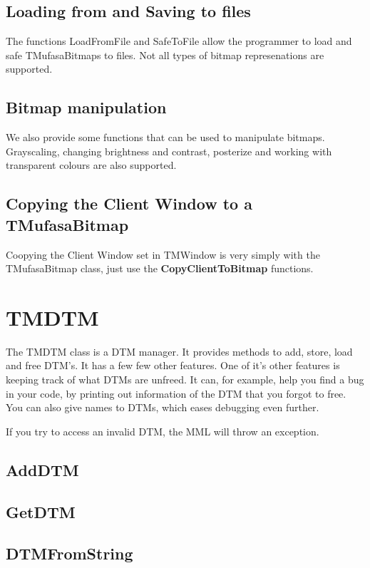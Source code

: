 \documentclass[a4paper]{report}
\begin{document}
\subsection{Loading from and Saving to files}

The functions LoadFromFile and SafeToFile allow the programmer to load and safe
TMufasaBitmaps to files. Not all types of bitmap represenations are supported.


\subsection{Bitmap manipulation}

We also provide some functions that can be used to manipulate bitmaps.
Grayscaling, changing brightness and contrast, posterize and working with
transparent colours are also supported.

\subsection{Copying the Client Window to a TMufasaBitmap}

Coopying the Client Window set in TMWindow is very simply with the TMufasaBitmap
class, just use the \textbf{CopyClientToBitmap} functions.


\section{TMDTM}

The TMDTM class is a DTM manager. It provides methods to add, store, load
and free DTM's. It has a few few other features. One of it's other features
is keeping track of what DTMs are unfreed. It can, for example, help you find
a bug in your code, by printing out information of the DTM that you forgot to
free. You can also give names to DTMs, which eases debugging even further.

If you try to access an invalid DTM, the MML will throw an exception.


\subsection{AddDTM}
\subsection{GetDTM}
\subsection{DTMFromString}
\end{document}
